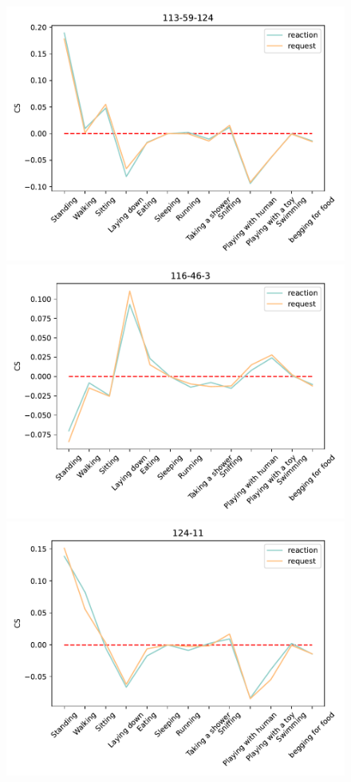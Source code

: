 \begin{figure}[ht]
		\begin{minipage}[b]{.3\linewidth}
			\centering
			\includegraphics[width=0.99\linewidth]{./35word/113-59-124.pdf}
		\end{minipage}
		\begin{minipage}[b]{.3\linewidth}
			\centering
			\includegraphics[width=0.99\linewidth]{./35word/116-46-3.pdf}
		\end{minipage}
		\begin{minipage}[b]{.3\linewidth}
			\centering
			\includegraphics[width=0.99\linewidth]{./35word/124-11.pdf}

\end{minipage}
\end{figure}
